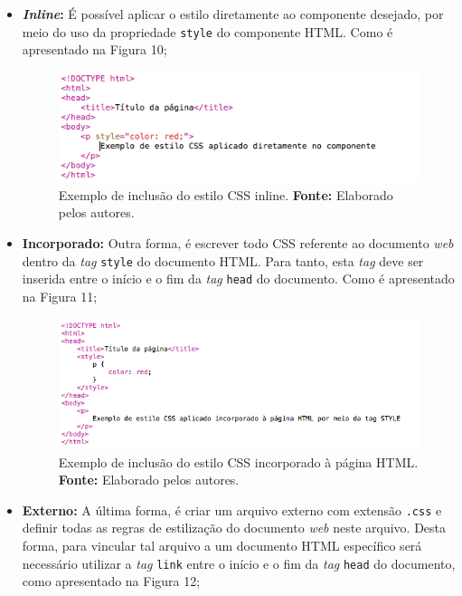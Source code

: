 \begin{itemize}
	\item \textbf{\textit{Inline}:} É possível aplicar o estilo diretamente ao componente desejado, por meio do uso da propriedade \texttt{style} do componente HTML. Como é apresentado na Figura 10;
	
	\newpage
	\begin{figure}[h!]
		\centerline{\includegraphics[scale=0.8]{./imagens/example_css_inline.png}}
		\caption[Exemplo de inclusão do estilo CSS inline]
		{Exemplo de inclusão do estilo CSS inline. \textbf{Fonte:} Elaborado pelos autores.}
		\label{fig:exemplo1}
	\end{figure}
	
	\item \textbf{Incorporado:} Outra forma, é escrever todo CSS referente ao  documento \textit{web} dentro da \textit{tag} \texttt{style} do documento HTML. Para tanto, esta \textit{tag} deve ser inserida entre o início e o fim da \textit{tag} \texttt{head} do documento. Como é apresentado na Figura 11;
	
	\begin{figure}[h!]
		\centerline{\includegraphics[scale=0.8]{./imagens/example_css_incorpored.png}}
		\caption[Exemplo de inclusão do estilo CSS incorporado à página HTML]
		{Exemplo de inclusão do estilo CSS incorporado à página HTML. \textbf{Fonte:} Elaborado pelos autores.}
		\label{fig:exemplo1}
	\end{figure}
	 
	\item \textbf{Externo:} A última forma, é criar um arquivo externo com extensão \texttt{.css} e definir todas as regras de estilização do documento \textit{web} neste arquivo. Desta forma, para vincular tal arquivo a um documento HTML específico será necessário utilizar a \textit{tag} \texttt{link} entre o início e o fim da \textit{tag} \texttt{head} do documento, como apresentado na Figura 12;
	

\end{itemize}

